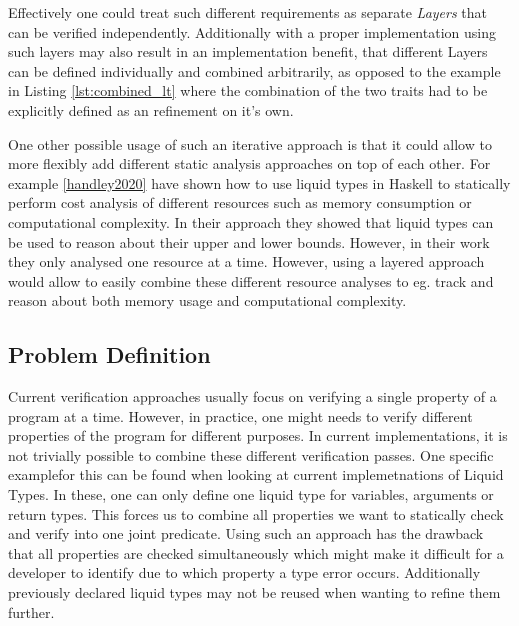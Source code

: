 \documentclass[acmsmall, review, screen]{acmart}
\begin{document}
Effectively one could treat such different requirements as separate \textit{Layers} that can be verified independently. Additionally with a proper implementation using such layers may also result in an implementation benefit, that different Layers can be defined individually and combined arbitrarily, as opposed to the example in Listing \ref{lst:combined_lt} where the combination of the two traits had to be explicitly defined as an refinement on it's own.

One other possible usage of such an iterative approach is that it could allow to more flexibly add different static analysis approaches on top of each other. For example \ref{handley2020} have shown how to use liquid types in Haskell to statically perform cost analysis of different resources such as memory consumption or computational complexity. In their approach they showed that liquid types can be used to reason about their upper and lower bounds. However, in their work they only analysed one resource at a time. However, using a layered approach would allow to easily combine these different resource analyses to eg. track and reason about both memory usage and computational complexity.

\subsection{Problem Definition}

Current verification approaches usually focus on verifying a single property of a program at a time. However, in practice, one might needs to verify different properties of the program for different purposes. In current implementations, it is not trivially possible to combine these different verification passes. One specific examplefor this can be found when looking at current implemetnations of Liquid Types. In these, one can only define one liquid type for variables, arguments or return types. This forces us to combine all properties we want to statically check and verify into one joint predicate. Using such an approach has the drawback that all properties are checked simultaneously which might make it difficult for a developer to identify due to which property a type error occurs. Additionally previously declared liquid types may not be reused when wanting to refine them further.
\end{document}
